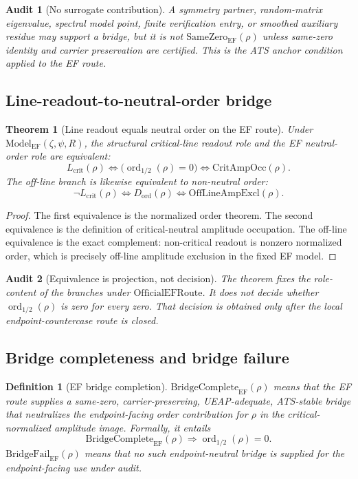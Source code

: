 \documentclass[11pt]{article}
\newtheorem{definition}{Definition}[section]
\newtheorem{theorem}{Theorem}[section]
\newtheorem{audit}{Audit}[section]
\newcommand{\Lcrit}{L_{\mathrm{crit}}}
\newcommand{\ModelEF}{\mathrm{Model}_{\mathrm{EF}}}
\newcommand{\OfficialEFRoute}{\mathrm{OfficialEFRoute}}
\newcommand{\CritAmpOcc}{\mathrm{CritAmpOcc}}
\newcommand{\OffAmpExcl}{\mathrm{OffLineAmpExcl}}
\newcommand{\ordhalf}{\operatorname{ord}_{1/2}}
\newcommand{\Dord}{D_{\mathrm{ord}}}
\newcommand{\BridgeCompleteEF}{\mathrm{BridgeComplete}_{\mathrm{EF}}}
\newcommand{\BridgeFailEF}{\mathrm{BridgeFail}_{\mathrm{EF}}}
\newcommand{\SameZeroEF}{\mathrm{SameZero}_{\mathrm{EF}}}
\begin{document}
\begin{audit}[No surrogate contribution]
A symmetry partner, random-matrix eigenvalue, spectral model point, finite verification entry, or smoothed auxiliary residue may support a bridge, but it is not \(\SameZeroEF(\rho)\) unless same-zero identity and carrier preservation are certified.  This is the ATS anchor condition applied to the EF route.
\end{audit}

\subsection{Line-readout-to-neutral-order bridge}

\begin{theorem}[Line readout equals neutral order on the EF route]
Under \(\ModelEF(\zeta,\psi,R)\), the structural critical-line readout role and the EF neutral-order role are equivalent:
\[
\Lcrit(\rho)\Longleftrightarrow \bigl(\ordhalf(\rho)=0\bigr)
\Longleftrightarrow \CritAmpOcc(\rho).
\]
The off-line branch is likewise equivalent to non-neutral order:
\[
\neg\Lcrit(\rho)\Longleftrightarrow \Dord(\rho)\Longleftrightarrow \OffAmpExcl(\rho).
\]
\end{theorem}

\begin{proof}
The first equivalence is the normalized order theorem.  The second equivalence is the definition of critical-neutral amplitude occupation.  The off-line equivalence is the exact complement: non-critical readout is nonzero normalized order, which is precisely off-line amplitude exclusion in the fixed EF model.
\end{proof}

\begin{audit}[Equivalence is projection, not decision]
The theorem fixes the role-content of the branches under \(\OfficialEFRoute\).  It does not decide whether \(\ordhalf(\rho)\) is zero for every zero.  That decision is obtained only after the local endpoint-countercase route is closed.
\end{audit}

\subsection{Bridge completeness and bridge failure}

\begin{definition}[EF bridge completion]
\(\BridgeCompleteEF(\rho)\) means that the EF route supplies a same-zero, carrier-preserving, UEAP-adequate, ATS-stable bridge that neutralizes the endpoint-facing order contribution for \(\rho\) in the critical-normalized amplitude image.  Formally, it entails
\[
\BridgeCompleteEF(\rho)\Rightarrow \ordhalf(\rho)=0.
\]
\(\BridgeFailEF(\rho)\) means that no such endpoint-neutral bridge is supplied for the endpoint-facing use under audit.
\end{definition}
\end{document}

